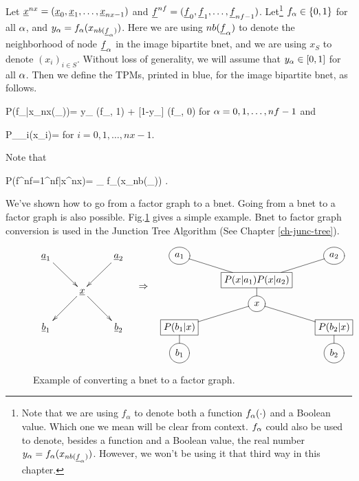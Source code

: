 Let ${\underline{x}}^{nx}=
({\underline{x}}_0, {\underline{x}}_1, \ldots, {\underline{x}}_{nx-1})$
and
${\underline{f}}^{nf}=
({\underline{f}}_0, {\underline{f}}_1, \ldots, {\underline{f}}_{nf-1})$.
Let\footnote{
Note that we are using
$f_\alpha$
to denote both a function
$f_\alpha(\cdot)$  and a Boolean
value. Which one we mean
will be clear from context.
$f_\alpha$ could also be used to
denote, besides a function and a Boolean value,
the real number
$y_\alpha=f_\alpha(x_{nb({\underline{f}}_\alpha)})$.
However, we won't be using it that third way
in this chapter.}
$f_\alpha\in \{0,1\}$ for all $\alpha$,
and $y_\alpha=
f_\alpha(x_{nb({\underline{f}}_\alpha)})$.
Here we are using $nb({\underline{f}}_\alpha)$
to denote  the neighborhood
of node ${\underline{f}}_\alpha$
in the image bipartite bnet,
and we are using $x_S$ to denote
$(x_i)_{i\in S}$.
Without loss of
generality,
we will assume
that $y_\alpha\in[0,1]$ for all $\alpha$.
Then we define the TPMs, printed
in blue, for the
image bipartite bnet, 
as follows.




\beq\color{blue}
P(f_\alpha|x_{nx(\rvf_\alpha)})=
y_\alp
\delta(f_\alp, 1)
+
[1-y_\alp]
\delta(f_\alp, 0)
\;
\eeq
for $\alpha=0, 1, \ldots , nf-1$
and

\beq\color{blue}
P_{\rvx_i}(x_i)= 
\eeq
for $i=0, 1, \ldots, nx-1$.

Note that

\beq
P(f^{nf}=1^{nf}|x^{nx})=
\prod_\alpha
f_\alpha(x_{nb(\rvf_\alpha)})
\;.
\eeq

We've shown
how to go from a factor graph
to a bnet.
Going from a
bnet to a factor graph
is also possible.
Fig.\ref{fig-bnet-2-fg}
gives a simple example.
Bnet  to factor
graph conversion
is used in the Junction Tree
Algorithm (See Chapter \ref{ch-junc-tree}).
\begin{figure}[h!]
$$
\begin{array}{ccc}
\xymatrix{
\rva_1\ar[dr]
&
&\rva_2\ar[dl]
\\
&\rvx\ar[dr]\ar[dl]
\\
\rvb_1
&
&\rvb_2
}
&
\xymatrix{\\
\rdart}
&
\xymatrix@R=.7pc{
*++[o][F]{a_1}\ar@{-}[dr]
&
&*++[o][F]{a_2}\ar@{-}[dl]
\\
&*+[F]{P(x|a_1)P(x|a_2)}\ar@{-}[d]
\\
&*++[o][F]{x}\ar@{-}[dr]\ar@{-}[dl]
\\
*+[F]{P(b_1|x)}\ar@{-}[d]
&
&*+[F]{P(b_2|x)}\ar@{-}[d]
\\
*++[o][F]{b_1}
&
&*++[o][F]{b_2}
}
\end{array}
$$
\caption{
Example
of converting a bnet
to a factor graph.}
\label{fig-bnet-2-fg}
\end{figure}





